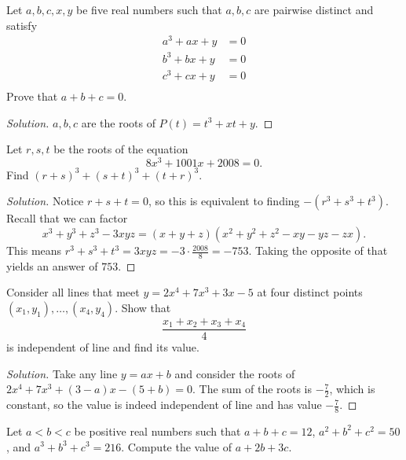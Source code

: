 \begin{prb}[JBMO 1999-1]
Let $a, b, c, x, y$ be five real numbers such that $a, b, c$ are pairwise
distinct and satisfy
\[ \begin{aligned}
a^3 + ax + y &= 0 \\
b^3 + bx + y &= 0 \\
c^3 + cx + y &= 0 \\
\end{aligned} \]
Prove that $a + b + c = 0$.
\end{prb}

\ifsolutions
\begin{proof}[Solution]
$a, b, c$ are the roots of $P(t) = t^3 + xt + y$.
\end{proof}
\fi

\begin{prb}[2008 AIME II-7]
Let $r, s, t$ be the roots of the equation
\[ 8x^3 + 1001x + 2008 = 0. \]
Find $(r + s)^3 + (s + t)^3 + (t + r)^3$.
\end{prb}

\ifsolutions
\begin{proof}[Solution]
Notice $r + s + t = 0$, so this is equivalent to finding $-(r^3 + s^3 + t^3)$.
Recall that we can factor
\[ x^3 + y^3 + z^3 - 3xyz = (x + y + z)(x^2 + y^2 + z^2 - xy - yz - zx). \]
This means $r^3 + s^3 + t^3 = 3xyz = -3 \cdot \frac{2008}{8} = -753$. Taking the
opposite of that yields an answer of $\boxed{753}$.
\end{proof}
\fi

\begin{prb}[Putnam 1977 A1]
Consider all lines that meet $y = 2x^4 + 7x^3 + 3x - 5$ at four distinct points
$(x_1, y_1), \dots, (x_4, y_4)$. Show that
\[ \frac{x_1 + x_2 + x_3 + x_4}{4} \]
is independent of line and find its value.
\end{prb}

\ifsolutions
\begin{proof}[Solution]
Take any line $y = ax + b$ and consider the roots of $2x^4 + 7x^3 + (3 - a)x -
(5 + b) = 0$. The sum of the roots is $-\frac{7}{2}$, which is constant, so the
value is indeed independent of line and has value $\boxed{-\frac{7}{8}}$.
\end{proof}
\fi

\begin{prb}
Let $a < b < c$ be positive real numbers such that $a + b + c = 12$, $a^2 + b^2
+ c^2 = 50$, and $a^3 + b^3 + c^3 = 216$. Compute the value of $a + 2b + 3c$.
\end{prb}

